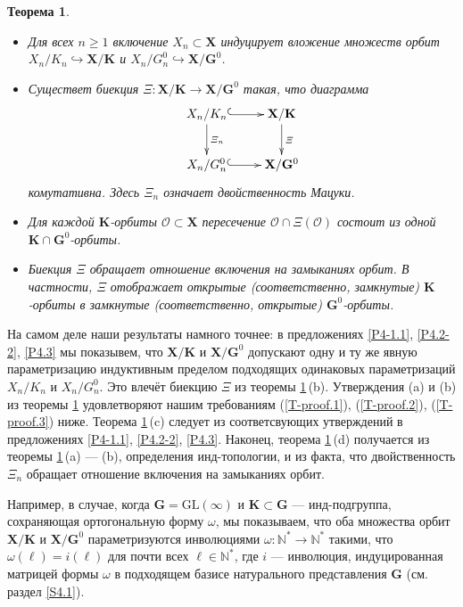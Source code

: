 \documentclass{amsart}
\newtheorem{theorem}{Теорема}
\theoremstyle{definition}
\newcommand{\bs}[1]{\boldsymbol{#1}}
\begin{document}
\begin{theorem}
\label{theorem-1}
\begin{itemize}
\item[\rm (a)] Для всех $n\geq 1$ включение $X_n\subset \mathbf{X}$
индуцирует вложение множеств орбит $X_n/K_n\hookrightarrow \mathbf{X}/\mathbf{K}$
и $X_n/G^0_n\hookrightarrow \mathbf{X}/\mathbf{G}^0$.
\item[\rm (b)] Существет биекция $\Xi:\mathbf{X}/\mathbf{K}\to\mathbf{X}/\mathbf{G}^0$
такая, что диаграмма
\begin{equation}
\label{diag}
\xymatrix{
X_n/K_n \ar@{->}[d]^{\Xi_n} \ar@{^{(}->}[r] & \mathbf{X}/\mathbf{K} \ar@{->}[d]^{\Xi} \\
X_n/G^0_n \ar@{^{(}->}[r] & \mathbf{X}/\mathbf{G}^0
}
\end{equation}
комутативна. Здесь $\Xi_n$ означает двойственность Мацуки.
\item[\rm (c)] Для каждой $\mathbf{K}$-орбиты $\bs{\mathcal{O}}\subset\mathbf{X}$
пересечение $\bs{\mathcal{O}}\cap\Xi(\bs{\mathcal{O}})$ состоит из одной $\mathbf{K}\cap\mathbf{G}^0$-орбиты.
\item[\rm (d)] Биекция $\Xi$ обращает отношение включения на замыканиях орбит.
В частности, $\Xi$ отображает открытые (соответственно, замкнутые) $\mathbf{K}$-орбиты в
замкнутые (соответственно, открытые) $\mathbf{G}^0$-орбиты.
\end{itemize}
\end{theorem}

На самом деле наши результаты намного точнее: в предложениях \ref{P4-1.1}, \ref{P4.2-2}, \ref{P4.3} мы показывем, что $\mathbf{X}/\mathbf{K}$ и $\mathbf{X}/\mathbf{G}^0$ допускают одну и ту же явную параметризацию индуктивным  пределом подходящих одинаковых параметризаций  $X_n/K_n$ и $X_n/G_n^0$.  Это влечёт биекцию $\Xi$ из теоремы  \ref{theorem-1}\,{\rm (b)}. Утверждения {\rm (a)} и {\rm (b)} из теоремы \ref{theorem-1} удовлетворяют нашим требованиям (\ref{T-proof.1}), (\ref{T-proof.2}), (\ref{T-proof.3}) ниже. Теорема \ref{theorem-1}\,{\rm (c)} следует из соответсвующих утверждений в предложениях \ref{P4-1.1}, \ref{P4.2-2}, \ref{P4.3}.
Наконец, теорема \ref{theorem-1}\,{\rm (d)} получается из
теоремы \ref{theorem-1}\,{\rm (a)} --- {\rm (b)}, определения инд-топологии,
и из факта, что двойственность $\Xi_n$ обращает отношение включения на замыканиях орбит.

Например, в случае, когда $\mathbf{G}=\mathrm{GL}(\infty)$ и $\mathbf{K}\subset \mathbf{G}$ --- инд-подгруппа, сохраняющая ортогональную форму $\omega$, мы показываем, что оба множества орбит $\mathbf{X}/\mathbf{K}$ и $\mathbf{X}/\mathbf{G}^0$ параметризуются инволюциями $ \omega: \mathbb{N}^* \to \mathbb{N}^*$ такими, что $\omega(\ell)=i(\ell)$ для почти всех $\ell \in \mathbb{N}^*$, где $i$ --- инволюция, индуцированная матрицей формы $\omega$ в подходящем базисе натурального представления  $\mathbf{G}$ (см. раздел \ref{S4.1}).
\end{document}
